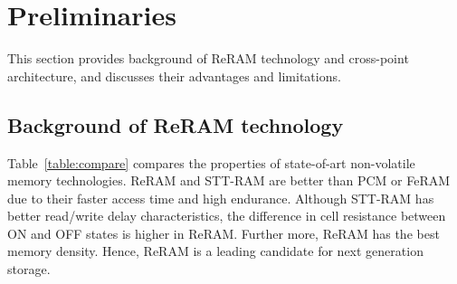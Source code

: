 \vspace{10pt}
\section{Preliminaries}\label{sec:preliminary}

This section provides background of ReRAM technology and cross-point architecture, and discusses their advantages and limitations. %


\subsection{Background of ReRAM technology}
Table~\ref{table:compare} compares the properties of state-of-art non-volatile memory technologies. ReRAM and STT-RAM are better than PCM or FeRAM due to their faster access time and high endurance.
Although STT-RAM has better read/write delay characteristics, the difference in cell resistance between ON and OFF states is higher in ReRAM. Further more, ReRAM has the best memory density.
Hence, ReRAM is a leading candidate for next generation storage.
%

